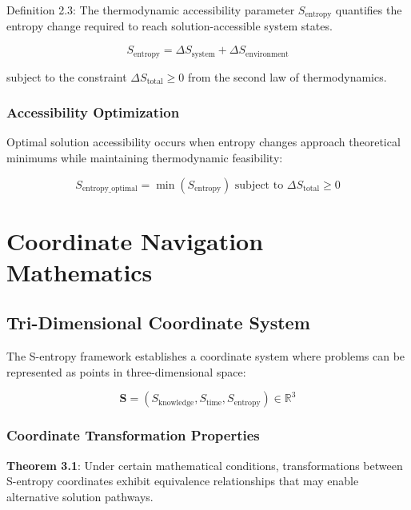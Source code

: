 \documentclass[11pt]{article}
\begin{document}
Definition 2.3: The thermodynamic accessibility parameter $S_{\text{entropy}}$ quantifies the entropy change required to reach solution-accessible system states.

\begin{equation}
S_{\text{entropy}} = \Delta S_{\text{system}} + \Delta S_{\text{environment}}
\label{eq:thermodynamic_accessibility}
\end{equation}

subject to the constraint $\Delta S_{\text{total}} \geq 0$ from the second law of thermodynamics.

\subsubsection{Accessibility Optimization}

Optimal solution accessibility occurs when entropy changes approach theoretical minimums while maintaining thermodynamic feasibility:

\begin{equation}
S_{\text{entropy\_optimal}} = \min\left(S_{\text{entropy}}\right) \text{ subject to } \Delta S_{\text{total}} \geq 0
\label{eq:entropy_optimization}
\end{equation}

\section{Coordinate Navigation Mathematics}

\subsection{Tri-Dimensional Coordinate System}

The S-entropy framework establishes a coordinate system where problems can be represented as points in three-dimensional space:

\begin{equation}
\mathbf{S} = (S_{\text{knowledge}}, S_{\text{time}}, S_{\text{entropy}}) \in \mathbb{R}^3
\label{eq:tri_dimensional_coordinates}
\end{equation}

\subsubsection{Coordinate Transformation Properties}

\textbf{Theorem 3.1}: Under certain mathematical conditions, transformations between S-entropy coordinates exhibit equivalence relationships that may enable alternative solution pathways.
\end{document}
